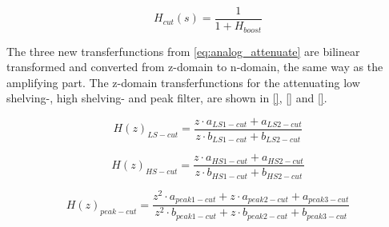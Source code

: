 \begin{equation}\label{eq:analog_attenuate}
        H_{cut}(s) = \frac{1}{1 + H_{boost}}
    \end{equation}
    
    \startexplain
    \stopexplain
    
The three new transferfunctions from \autoref{eq:analog_attenuate} are bilinear transformed and converted from z-domain to n-domain, the same way as the amplifying part. The z-domain transferfunctions for the attenuating low shelving-, high shelving- and peak filter, are shown in \autoref{}, \autoref{} and \autoref{}.

\begin{equation}\label{eq:Hz_LS_att}
        H(z)_{LS-cut} =\frac{z \cdot a_{LS1-cut} + a_{LS2-cut}}{z \cdot b_{LS1-cut} + b_{LS2-cut}}
    \end{equation}
    
    \startexplain
    \stopexplain
    
\begin{equation}\label{eq:Hz_HS_att}
        H(z)_{HS-cut} = \frac{z \cdot a_{HS1-cut} + a_{HS2-cut}}{z \cdot b_{HS1-cut} + b_{HS2-cut}}
    \end{equation}
    
    \startexplain
    \stopexplain

\begin{equation}\label{eq:Hz_peak_att}
        H(z)_{peak-cut} =  \frac{z^2 \cdot a_{peak1-cut} + z \cdot a_{peak2-cut} + a_{peak3-cut}}{z^2 \cdot b_{peak1-cut} + z \cdot b_{peak2-cut} + b_{peak3-cut}}
    \end{equation}
    
